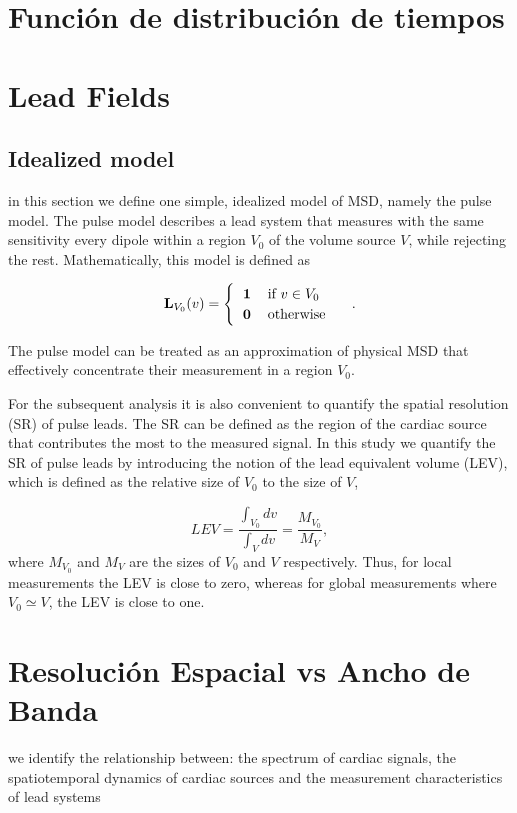 \section{Función de distribución de tiempos}

\section{Lead Fields}

\subsection{Idealized model}

in this section we define one simple, idealized model of MSD, namely the pulse
model. The pulse model describes a lead system that measures with the same
sensitivity every dipole within a region $V_0$ of the volume source $V$, while
rejecting the rest. Mathematically, this model is defined as

\begin{equation}
\label{def:pulso}
\mathbf{L}_{V_0}(v)=
\begin{cases}
    \begin{tabular}{ll}
    $\mathbf{1}$ & if $v\in V_0$\\
    $\mathbf{0}$ & otherwise
        \end{tabular}
 \end{cases}.
\end{equation}

The pulse model can be treated as an approximation of physical MSD that
effectively concentrate their measurement in a region $V_0$.

For the subsequent analysis it is also convenient to quantify the spatial
resolution (SR) of pulse leads. The SR can be defined as the region of the
cardiac source that contributes the most to the measured signal. In this study
we quantify the SR of pulse leads by introducing the notion of the lead
equivalent volume (LEV), which is defined as the relative size of $V_{0}$ to
the size of $V$,

\begin{equation}
LEV=\frac{\int_{V_{0}}{dv}}{\int_{V}{dv}}=\frac{M_{V_{0}}}{M_V},\label{eq:SR}
\end{equation}
where $M_{V_{0}}$ and $M_V$ are the sizes of $V_{0}$ and $V$ respectively.
Thus, for local measurements the LEV is close to zero, whereas for global
measurements where $V_0\simeq V$, the LEV is close to one.


\section{Resolución Espacial vs Ancho de Banda}
we identify the relationship between: the spectrum of cardiac signals,
the spatiotemporal dynamics of cardiac sources and the measurement
characteristics of lead systems
